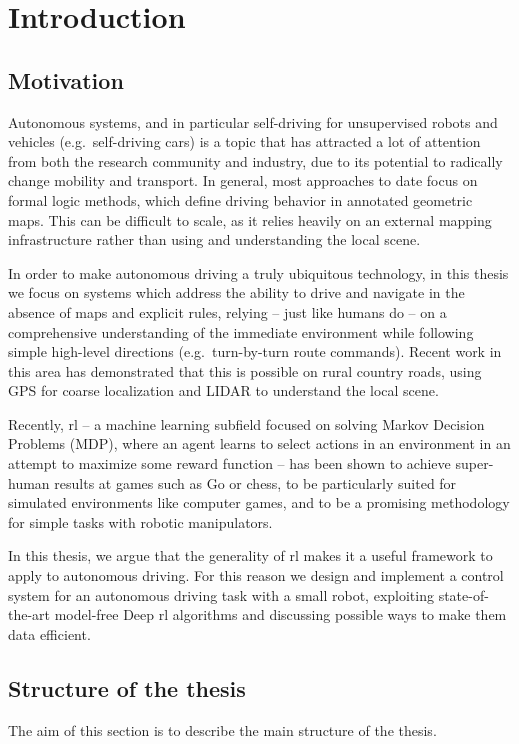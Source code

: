 \chapter{Introduction}

\section{Motivation}

Autonomous systems, and in particular self-driving for unsupervised robots and vehicles (e.g.\ self-driving cars) is a topic that has attracted a lot of attention from both the research community and industry, due to its potential to radically change mobility and transport. In general, most approaches to date focus on formal logic methods, which define driving behavior in annotated geometric maps. This can be difficult to scale, as it relies heavily on an external mapping infrastructure rather than using and understanding the local scene.

In order to make autonomous driving a truly ubiquitous technology, in this thesis we focus on systems which address the ability to drive and navigate in the absence of maps and explicit rules, relying – just like humans do – on a comprehensive understanding of the immediate environment while following simple high-level directions (e.g.\ turn-by-turn route commands). Recent work in this area has demonstrated that this is possible on rural country roads, using GPS for coarse localization and LIDAR to understand the local scene. 

Recently, \gls{rl} – a machine learning subfield focused on solving Markov Decision Problems (MDP), where an agent learns to select actions in an environment in an attempt to maximize some reward function – has been shown to achieve super-human results at games such as Go or chess, to be particularly suited for simulated environments like computer games, and to be a promising methodology for simple tasks with robotic manipulators.

In this thesis, we argue that the generality of \gls{rl} makes it a useful framework to apply to autonomous driving. 
For this reason we design and implement a control system for an autonomous driving task with a small robot, exploiting state-of-the-art model-free Deep \gls{rl} algorithms and discussing possible ways to make them data efficient.

\section{Structure of the thesis}
The aim of this section is to describe the main structure of the thesis.

